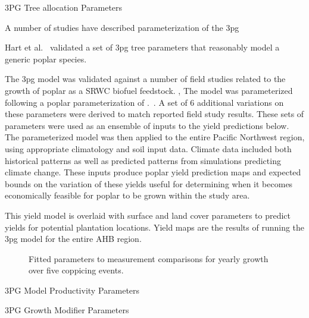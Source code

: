 \documentclass[preprint,12pt]{elsarticle}
\begin{document}
\begin{table}%
\caption{3PG Tree allocation Parameters}

\label{tab:3pg-tree-allocate}
\end{table}

A number of studies have described parameterization of the \ac{3pg}

Hart et al.~\cite{Hart2014} validated a set of \ac{3pg} tree
parameters that reasonably model a generic poplar
species.  

The \ac{3pg} model was validated against a number of field studies
related to the growth of poplar as a \ac{SRWC} biofuel
feedstock\cite{Pontailler1999,Proe1999,Afas2008a}. , The model was
parameterized following a poplar parameterization of
.~\cite{Headlee2012}.  A set of 6 additional variations on these
parameters were derived to match reported field study results.  These
sets of parameters were used as an ensemble of inputs to the yield
predictions below. The parameterized model was then applied to the
entire Pacific Northwest region, using appropriate climatology and
soil input data.  Climate data included both historical patterns as
well as predicted patterns from simulations predicting climate change.
These inputs produce poplar yield prediction maps and expected bounds
on the variation of these yields useful for determining when it becomes economically
feasible for poplar to be grown within the study area. 

This yield model is overlaid with surface and land cover
parameters to predict yields for potential plantation locations.
Yield maps are the results of running the \ac{3pg} model for the
entire \ac{AHB} region. 



\begin{figure}%
  \centering
  
  \caption{Fitted parameters to measurement comparisons for yearly growth
      over five coppicing events.}
\label{fig:pont-best}
\end{figure}

\begin{table}%
\caption{3PG Model Productivity Parameters}

\label{tab:3pg-tree-productivity}
 \end{table}

\begin{table}%
\caption{3PG Growth Modifier Parameters}

\label{tab:3pg-tree-modifiers}
 \end{table}
\end{document}
